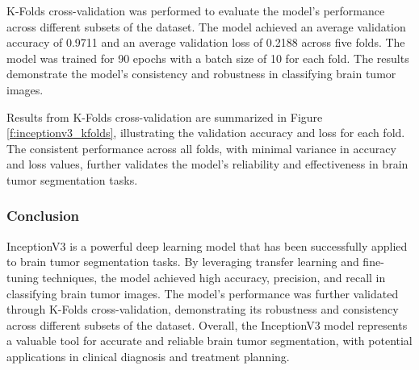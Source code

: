 K-Folds cross-validation was performed to evaluate the model's performance across different subsets of the dataset. The model achieved an average validation accuracy of 0.9711 and an average validation loss of 0.2188 across five folds. The model was trained for 90 epochs with a batch size of 10 for each fold. The results demonstrate the model's consistency and robustness in classifying brain tumor images.

Results from K-Folds cross-validation are summarized in Figure \ref{f:inceptionv3_kfolds}, illustrating the validation accuracy and loss for each fold. The consistent performance across all folds, with minimal variance in accuracy and loss values, further validates the model's reliability and effectiveness in brain tumor segmentation tasks.



\subsubsection{Conclusion}

InceptionV3 is a powerful deep learning model that has been successfully applied to brain tumor segmentation tasks. By leveraging transfer learning and fine-tuning techniques, the model achieved high accuracy, precision, and recall in classifying brain tumor images. The model's performance was further validated through K-Folds cross-validation, demonstrating its robustness and consistency across different subsets of the dataset. Overall, the InceptionV3 model represents a valuable tool for accurate and reliable brain tumor segmentation, with potential applications in clinical diagnosis and treatment planning.
